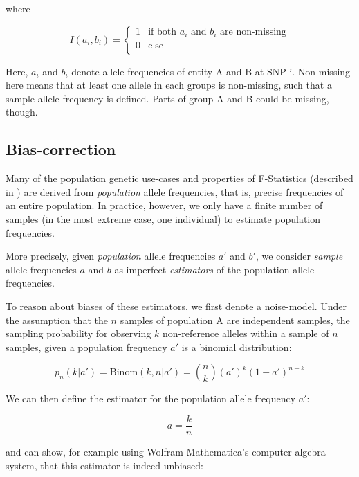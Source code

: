 \documentclass{article}
\begin{document}
where

\begin{equation}
I\left(a_i,b_i\right)=
\begin{cases}
    1 & \text{if both $a_i$ and $b_i$ are non-missing} \\
    0 & \text{else} \\
\end{cases}
\end{equation}

Here, \(a_i\) and \(b_i\) denote allele frequencies of entity A and B at SNP i. Non-missing here means that at least one allele in each groups is non-missing, such that a sample allele frequency is defined. Parts of group A and B could be missing, though.

\subsection{Bias-correction}

Many of the population genetic use-cases and properties of F-Statistics (described in \cite{Patterson2012-yq}) are derived from \textit{population} allele frequencies, that is, precise frequencies of an entire population. In practice, however, we only have a finite number of samples (in the most extreme case, one individual) to estimate population frequencies. 

More precisely, given \textit{ population }allele frequencies \(a'\) and \(b'\), we consider \textit{ sample }allele frequencies \(a\) and \(b\)
as imperfect \textit{ estimators }of the population allele frequencies. 

To reason about biases of these estimators, we first denote a noise-model. Under the assumption that the \(n\) samples of population A are independent samples, the sampling probability for observing \(k\) non-reference alleles within a sample of \(n\) samples, given a population frequency \(a'\) is a binomial distribution:

\begin{equation}
p_n(k|a')=\text{Binom}(k,n|a')=\binom{n}{k}\left(a'\right)^k(1-a')^{n-k}
\end{equation}

We can then define the estimator for the population allele frequency \(a'\):

\begin{equation}
a=\frac{k}{n}
\end{equation}

and can show, for example using Wolfram Mathematica's computer algebra system, that this estimator is indeed unbiased:
\end{document}
